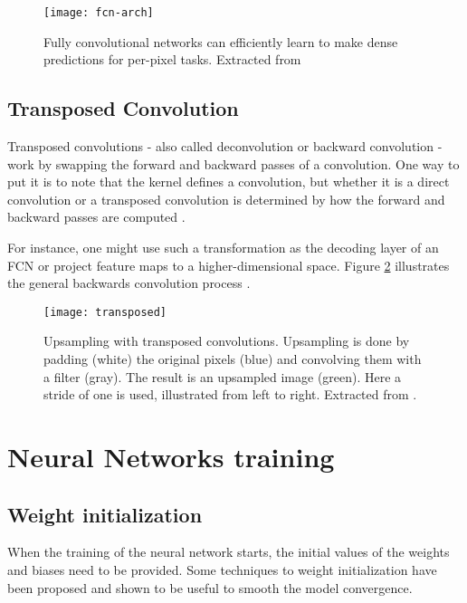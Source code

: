 \begin{figure}[!htb]
\centering
\texttt{[image: fcn-arch]}
\caption{Fully convolutional networks can efficiently learn to make dense predictions for
per-pixel tasks. Extracted from \cite{long2015fully}}
\label{fcn-arch}
\end{figure}

\subsection{Transposed Convolution}

Transposed convolutions - also called deconvolution or backward convolution - work by swapping the forward and backward passes of a convolution. One way to put it is to note that the kernel defines a convolution, but whether it is a direct convolution or a transposed convolution is determined by how the forward and backward passes are computed \cite{dumoulin2016guide}.

For instance, one might use such a transformation as the decoding layer of an FCN or project feature maps to a higher-dimensional space. Figure \ref{fig:transposed} illustrates the general backwards convolution process \cite{dumoulin2016guide}.

\begin{figure}[!htb]
\centering
\texttt{[image: transposed]}

\caption{Upsampling with transposed convolutions. Upsampling is done by padding
(white) the original pixels (blue) and convolving them with a filter (gray). The result is
an upsampled image (green). Here a stride of one is used, illustrated from left to right. Extracted from \cite{dumoulin2016guide}.} \label{fig:transposed}
\end{figure}

\section{Neural Networks training}

\subsection{Weight initialization}
When the training of the neural network starts, the initial values of the weights and biases need to be provided. Some techniques to weight initialization have been proposed and shown to be useful to smooth the model convergence.

